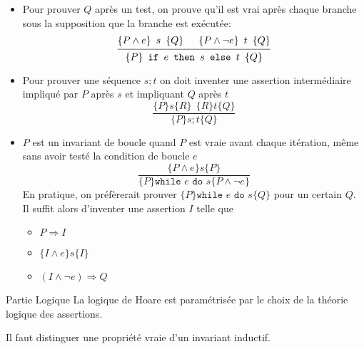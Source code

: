 \documentclass{cours}
\begin{document}
\begin{définition}
\begin{itemize}
\begin{equation*}
\begin{prooftree}
				\end{prooftree}
			\end{equation*}
			On peut supposer que notre système logique est capable de prouver des formules sur les assertions.
		\item Pour prouver $Q$ après un test, on prouve qu'il est vrai après chaque branche sous la supposition que la branche est exécutée: 
			\begin{equation*}
				\begin{prooftree}
					\hypo{\hoare{P\land e}{s}{Q}}
					\hypo{\hoare{P\land\lnot e}{t}{Q}}
					\infer2{\hoare{P}{\texttt{if } e \texttt{ then } s \texttt{ else } t}{Q}}
				\end{prooftree}
			\end{equation*}
		\item Pour prouver une séquence $s; t$ on doit inventer une assertion intermédiaire impliqué par $P$ après $s$ et impliquant $Q$ après $t$
			\begin{equation*}
				\frac{\{P\} s \{R\}\ \ \{R\} t \{Q\}}{\{P\} s; t \{Q\}}
			\end{equation*}
		\item $P$ est un invariant de boucle quand $P$ est vraie avant chaque itération, même sans avoir testé la condition de boucle $e$
			\begin{equation*}
				\frac{\{P \land e\} s \{P\}}{\{P\} \texttt{while } e \texttt{ do } s \{P \land \lnot e\}}	
			\end{equation*}
			En pratique, on préfèrerait prouver $\{P\} \texttt{while } e \texttt{ do } s \{Q\}$ pour un certain $Q$. Il suffit alors d'inventer une assertion $I$ telle que 
			\begin{itemize}
				\item $P \Rightarrow I$
				\item $\{I \land e\} s \{I\}$
				\item $(I \land \lnot e) \Rightarrow Q$
			\end{itemize}

	\end{itemize}
\end{définition}

\begin{définition}
	{Partie Logique}{}
	La logique de Hoare est paramétrisée par le choix de la théorie logique des assertions.
\end{définition}

Il faut distinguer une propriété vraie d'un invariant inductif.
\end{document}
